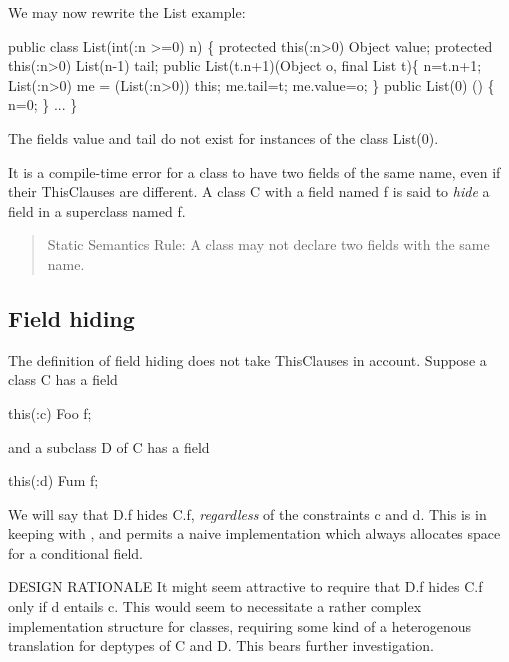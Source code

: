 \begin{example}

We may now rewrite the List example:
\begin{x10}
public class List(int(:n >=0) n) \{
  protected this(:n>0) Object  value;
  protected this(:n>0) List(n-1)  tail;
  public List(t.n+1)(Object o, final List t)\{
     n=t.n+1;
     List(:n>0) me = (List(:n>0)) this;
     me.tail=t;
     me.value=o;
  \}
  public List(0) () \{
     n=0;
  \}
  ...
\}
\end{x10}

The fields {\cf value} and {\cf tail} do not exist for instances of the class
{\cf List(0)}.
\end{example}

It is a compile-time error for a class to have two fields of the same
name, even if their {\cf ThisClauses} are different. A class {\cf C} with a field
named {\cf f} is said to {\em hide} a field in a superclass named {\cf f}.

\begin{quotation}
 {\sc Static Semantics Rule:}
     A class may not declare two fields with the same name.
\end{quotation}

\subsection{Field hiding}

The definition of field hiding does not take {\cf ThisClauses} in
account. Suppose a class {\cf C} has a field

\begin{x10}
 this(:c) Foo f;  
\end{x10}
\noindent and a subclass {\cf D} of {\cf C} has a field
\begin{x10}
 this(:d) Fum f;  
\end{x10}

We will say that {\cf D.f} hides {\cf C.f}, {\em regardless} of the
constraints {\cf c} and {\cf d}. This is in keeping with \Java, and
permits a naive implementation which always allocates space for a
conditional field.

{\sc DESIGN RATIONALE} It might seem attractive to require that {\cf
D.f} hides {\cf C.f} only if {\cf d} entails {\cf c}. This would seem
to necessitate a rather complex implementation structure for classes,
requiring some kind of a heterogenous translation for deptypes of {\cf C}
and {\cf D}. This bears further investigation.

